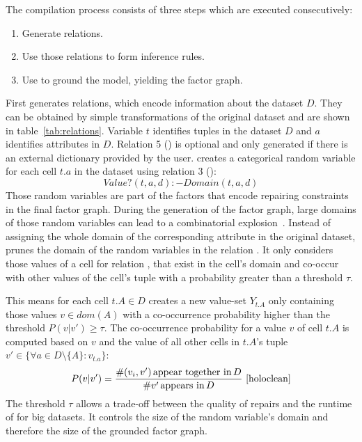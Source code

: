  The compilation process consists of three steps which are executed consecutively:
  \begin{enumerate}
    \item Generate \ddlog{} relations.
    \item Use those relations to form inference rules.
    \item Use \deepdive{} to ground the model, yielding the factor graph.
  \end{enumerate}
    
  First \holoclean{} generates \ddlog{} relations, which encode information about the dataset $D$.
  They can be obtained by simple transformations of the original dataset and are shown in table~\ref{tab:relations}.
  Variable $t$ identifies tuples in the dataset $D$ and $a$ identifies attributes in $D$.
  Relation 5 () is optional and only generated if there is an external dictionary provided by the user.
  \holoclean{} creates a categorical random variable for each cell $t.a$ in the dataset using relation 3 ():
  \begin{equation}
    Value?(t,a,d):-Domain(t,a,d)\label{equ:cells}
  \end{equation}
  Those random variables are part of the factors that encode repairing constraints in the final factor graph.
  During the generation of the factor graph, large domains of those random variables can lead to a combinatorial explosion~\cite{pgm}.
  Instead of assigning the whole domain of the corresponding attribute in the original dataset, \holoclean{} prunes the domain of the random variables in the relation .
  It only considers those values of a cell for relation , that exist in the cell's domain and co-occur with other values of the cell's tuple with a probability greater than a threshold $\tau$.

  This means for each cell $t.A \in D$ \holoclean{} creates a new value-set $Y_{t.A}$ only containing those values $v \in dom(A)$ with a co-occurrence probability higher than the threshold $P(v|v') \geq \tau$.
  The co-occurrence probability for a value $v$ of cell $t.A$ is computed based on $v$ and the value of all other cells in $t.A$'s tuple $v' \in \{\forall a \in D\setminus\{A\}: v_{t.a}\}$:
  \begin{equation}
    P(v|v') = \frac{\#(v_i,v')\,\text{appear together in}\, D}{\#v'\,\text{appears in}\, D}~\cite{holoclean}
  \end{equation}
  The threshold $\tau$ allows a trade-off between the quality of repairs and the runtime of \holoclean{} for big datasets.
  It controls the size of the random variable's domain and therefore the size of the grounded factor graph.

